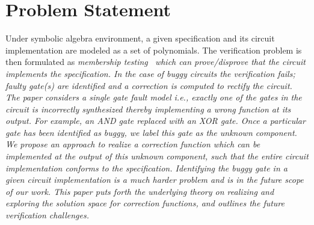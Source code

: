 \section{Problem Statement}
\label{sec:prstmnt}

Under symbolic algebra environment, a given specification and its circuit implementation are modeled as a set of polynomials. The verification problem is then formulated as \it{membership testing}~\cite{gb_book} which can prove/disprove that the circuit implements the specification. In the case of buggy circuits the verification fails; faulty gate(s) are identified and a correction is computed to rectify the circuit. The paper considers a single gate fault model i.e., exactly one of the gates in the circuit is incorrectly synthesized thereby implementing a wrong function at its output. For example, an AND gate replaced with an XOR gate. Once a particular gate has been identified as buggy, we label this gate as the \it{unknown component}. We propose an approach to realize a correction function which can be implemented at the output of this \it{unknown component}, such that the entire circuit implementation conforms to the specification. Identifying the buggy gate in a given circuit implementation is a much harder problem and is in the future scope of our work. This paper puts forth the underlying theory on realizing and exploring the solution space for correction functions, and outlines the future verification challenges.